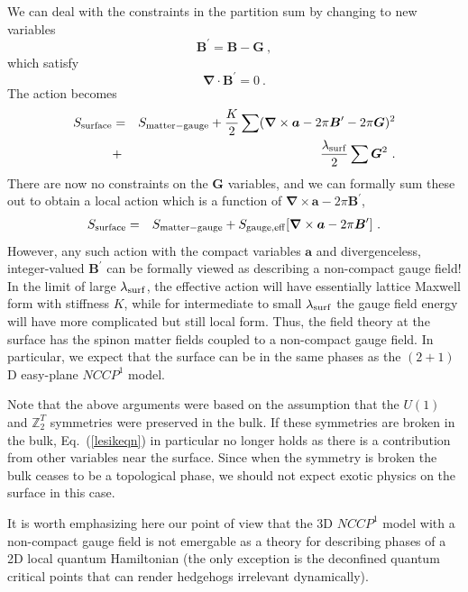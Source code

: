 \documentclass[prb,twocolumn]{revtex4-1}
\def\ztwot{\mathbb{Z}_2^T}
\begin{document}
 We can deal with the constraints in the partition sum by changing to new variables
\begin{equation}
{\bm B}^\prime = {\bm B} - {\bm G} ~,
\end{equation}
which satisfy
\begin{equation}
{\bm \nabla} \cdot {\bm B}^\prime = 0 ~.
\end{equation}
The action becomes 
\begin{eqnarray*}
S_{\rm surface} &=& S_{\rm matter-gauge} + \frac{K}{2}\sum  ({\bm\nabla} \times {\bm a}  - 2\pi {\bm B}^\prime - 2\pi {\bm G})^2 \\
 &+& \frac{\lambda_{\rm surf}}{2}\sum  {\bm G}^2 ~.
\end{eqnarray*}
There are now no constraints on the ${\bm G}$ variables, and we can formally sum these out to obtain a local action which is a function of ${\bm\nabla} \times {\bm a} - 2\pi {\bm B}^\prime$,
\begin{eqnarray*}
S_{\rm surface} &=& S_{\rm matter-gauge} + S_{\rm gauge, eff}[{\bm\nabla} \times {\bm a}  - 2\pi {\bm B}^\prime] ~.
\end{eqnarray*}
However, any such action with the compact variables ${\bm a}$ and divergenceless, integer-valued ${\bm B}^\prime$ can be formally viewed as describing a non-compact gauge field!  In the limit of large $\lambda_{\rm surf}$, the effective action will have essentially lattice Maxwell form with stiffness $K$, while for intermediate to small $\lambda_{\rm surf}$ the gauge field energy will have more complicated but still local form.  Thus, the field theory at the surface has the spinon matter fields coupled to a non-compact gauge field.  In particular, we expect that the surface can be in the same phases as the $(2+1)$D easy-plane $NCCP^1$ model.

Note that the above arguments were based on the assumption that the $U(1)$ and $\ztwot$ symmetries were preserved in the bulk. If these symmetries are broken in the bulk, Eq.~(\ref{lesikeqn}) in particular no longer holds as there is a contribution from other variables near the surface. Since when the symmetry is broken the bulk ceases to be a topological phase, we should not expect exotic physics on the surface in this case.

It is worth emphasizing here our point of view that the 3D $NCCP^1$ model with a non-compact gauge field is not emergable as a theory for describing phases of a 2D local quantum Hamiltonian (the only exception is the deconfined quantum critical points that can render hedgehogs irrelevant dynamically). 
\end{document}
